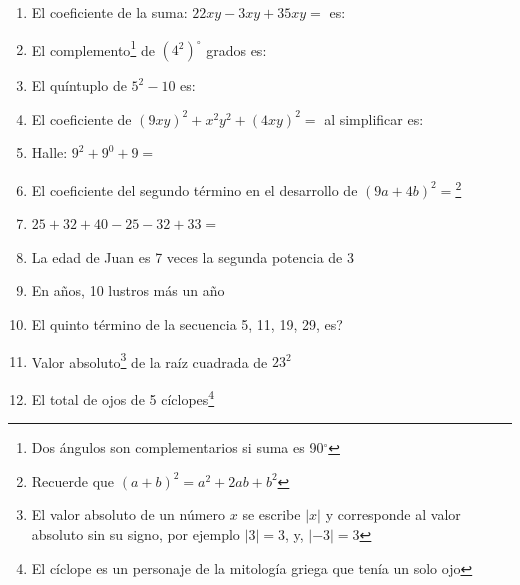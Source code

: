\documentclass[10pt,twoside]{article}
\begin{document}
\begin{enumerate}
 \item El coeficiente de la suma: $22xy-3xy+35xy=$ es:
 \item El complemento\footnote{Dos ángulos son complementarios si suma es 90$^{\circ}$} de $(4^{2})^{\circ}$ grados es:
 \item El quíntuplo de $5^{2}-10$ es:
 \item El coeficiente de $(9xy)^{2}+x^{2}y^{2}+(4xy)^{2}=$ al simplificar es:
 \item Halle: $9^{2}+9^{0}+9=$
 \item El coeficiente del segundo término en el desarrollo de $(9a+4b)^{2}=$\footnote{Recuerde que $(a+b)^{2}=a^{2}+2ab+b^{2}$}
 \item $25+32+40-25-32+33=$
 \item La edad de Juan es 7 veces la segunda potencia de 3
 \item En años, 10 lustros más un año
 \item El quinto término de la secuencia 5, 11, 19, 29, es?
 \item Valor absoluto\footnote{El valor absoluto de un número $x$ se escribe $|x|$ y corresponde al valor absoluto sin su signo, por ejemplo $|3|=3$, y, $|-3|=3$} de la raíz cuadrada de $23^{2}$
 \item El total de ojos de 5 cíclopes\footnote{El cíclope es un personaje de la mitología griega que tenía un solo ojo}

\end{enumerate}
\end{document}
